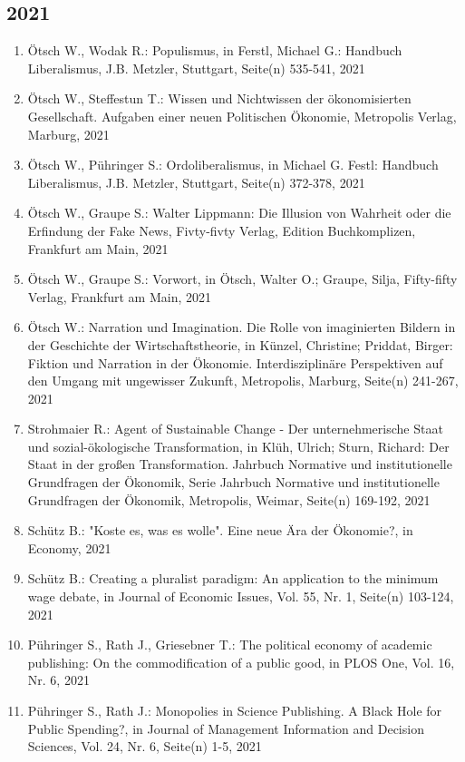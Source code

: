 \subsection*{2021}
\begin{enumerate}
    	 \item Ötsch W., Wodak R.: Populismus, in Ferstl, Michael G.: Handbuch Liberalismus, J.B. Metzler, Stuttgart, Seite(n) 535-541, 2021
	 \item Ötsch W., Steffestun T.: Wissen und Nichtwissen der ökonomisierten Gesellschaft. Aufgaben einer neuen Politischen Ökonomie, Metropolis Verlag, Marburg, 2021
	 \item Ötsch W., Pühringer S.: Ordoliberalismus, in Michael G. Festl: Handbuch Liberalismus, J.B. Metzler, Stuttgart, Seite(n) 372-378, 2021
	 \item Ötsch W., Graupe S.: Walter Lippmann: Die Illusion von Wahrheit oder die Erfindung der Fake News, Fivty-fivty Verlag, Edition Buchkomplizen, Frankfurt am Main, 2021
	 \item Ötsch W., Graupe S.: Vorwort, in Ötsch, Walter O.; Graupe, Silja, Fifty-fifty Verlag, Frankfurt am Main, 2021
	 \item Ötsch W.: Narration und Imagination. Die Rolle von imaginierten Bildern in der Geschichte der Wirtschaftstheorie, in Künzel, Christine; Priddat, Birger: Fiktion und Narration in der Ökonomie. Interdisziplinäre Perspektiven auf den Umgang mit ungewisser Zukunft, Metropolis, Marburg, Seite(n) 241-267, 2021
	 \item Strohmaier R.: Agent of Sustainable Change - Der unternehmerische Staat und sozial-ökologische Transformation, in Klüh, Ulrich; Sturn, Richard: Der Staat in der großen Transformation. Jahrbuch Normative und institutionelle Grundfragen der Ökonomik, Serie Jahrbuch Normative und institutionelle Grundfragen der Ökonomik, Metropolis, Weimar, Seite(n) 169-192, 2021
	 \item Schütz B.: "Koste es, was es wolle". Eine neue Ära der Ökonomie?, in Economy, 2021
	 \item Schütz B.: Creating a pluralist paradigm: An application to the minimum wage debate, in Journal of Economic Issues, Vol. 55, Nr. 1, Seite(n) 103-124, 2021
	 \item Pühringer S., Rath J., Griesebner T.: The political economy of academic publishing: On the commodification of a public good, in PLOS One, Vol. 16, Nr. 6, 2021
	 \item Pühringer S., Rath J.: Monopolies in Science Publishing. A Black Hole for Public Spending?, in Journal of Management Information and Decision Sciences, Vol. 24, Nr. 6, Seite(n) 1-5, 2021

\end{enumerate}

